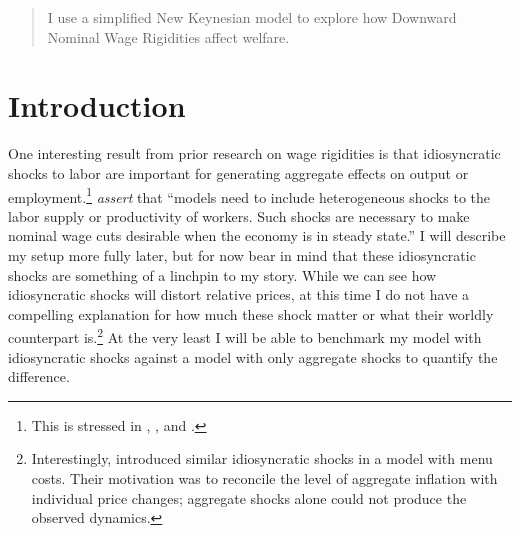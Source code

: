\documentclass[12pt,a4paper]{scrartcl}            %
\begin{document}




\begin{abstract}
I use a simplified New Keynesian model to explore how Downward Nominal Wage Rigidities affect welfare.

\end{abstract}

\section{Introduction}
\label{sec:introduction}

One interesting result from prior research on wage rigidities is that idiosyncratic shocks to labor are important for generating aggregate effects on output or employment.\footnote{
This is stressed in \cite{elsby_2009}, \cite{benigno_ricci_2011}, and \cite{daly_hobijn_2013}.}
\cite{daly_hobijn_2013} \emph{assert} that ``models need to include heterogeneous shocks to the labor supply or productivity of workers. Such shocks are necessary to make nominal wage cuts desirable when the economy is in steady state.''
I will describe my setup more fully later, but for now bear in mind that these idiosyncratic shocks are something of a linchpin to my story.
While we can see how idiosyncratic shocks will distort relative prices, at this time I do not have a compelling explanation for how much these shock matter or what their worldly counterpart is.\footnote{
Interestingly, \cite{golosov_lucas_2007} introduced similar idiosyncratic shocks in a model with menu costs.
Their motivation was to reconcile the level of aggregate inflation with individual price changes;
aggregate shocks alone could not produce the observed dynamics.
}
At the very least I will be able to benchmark my model with idiosyncratic shocks against a model with only aggregate shocks to quantify the difference.

\end{document}
